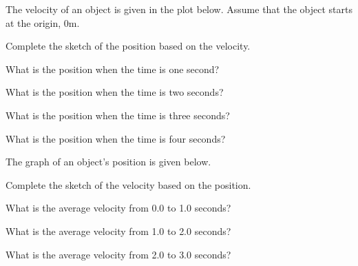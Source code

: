 \begin{problem}
\item The velocity of an object is given in the plot below.  Assume
  that the object starts at the origin, 0m.

  \begin{subproblem}
  \item Complete the sketch of the position based on the velocity.

    \scalebox{0.8}{}

    \item What is the position when the time is one second?
      \vspace{3em}

    \item What is the position when the time is two seconds?
      \vspace{3em}

    \item What is the position when the time is three seconds?
      \vspace{3em}

    \item What is the position when the time is four seconds?
      \vspace{3em}

  \end{subproblem}

  \clearpage

\item The graph of an object's position is given below.

  \begin{subproblem}
  \item Complete the sketch of the velocity based on the position.

    \scalebox{0.8}{}

    \item What is the average velocity from 0.0 to 1.0  seconds?
      \vspace{3em}

    \item What is the average velocity from 1.0 to 2.0  seconds?
      \vspace{3em}

    \item What is the average velocity from 2.0 to 3.0  seconds?
      \vspace{3em}


\end{subproblem}
\end{problem}
